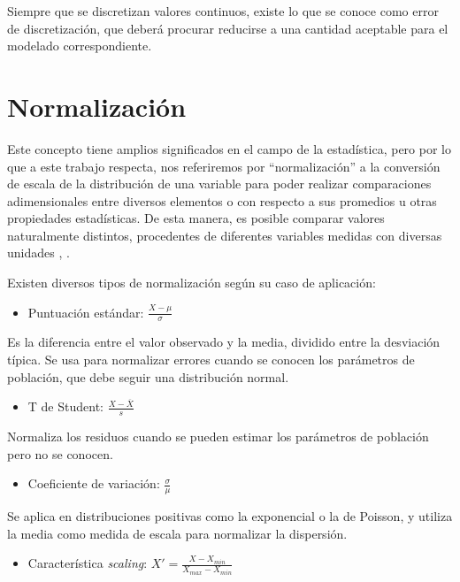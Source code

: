 Siempre que se discretizan valores continuos, existe lo que se conoce como error de discretización, que deberá procurar reducirse a una cantidad aceptable para el modelado correspondiente.

\section{Normalización}

Este concepto tiene amplios significados en el campo de la estadística, pero por lo que a este trabajo respecta, nos referiremos por ``normalización'' a la conversión de escala de la distribución de una variable para poder realizar comparaciones adimensionales entre diversos elementos o con respecto a sus promedios u otras propiedades estadísticas. De esta manera, es posible comparar valores naturalmente distintos, procedentes de diferentes variables medidas con diversas unidades \cite{normalizacion}, \cite{normalizacion2}.

Existen diversos tipos de normalización según su caso de aplicación:

\begin{itemize}
    \item Puntuación estándar: $\frac{X - \mu}{\sigma}$
\end{itemize}

Es  la diferencia entre el valor observado y la media, dividido entre la desviación típica. Se usa para normalizar errores cuando se conocen los parámetros de población, que debe seguir una distribución normal.

\begin{itemize}
    \item T de Student: $\frac{X - \overline{X}}{s}$
\end{itemize}

Normaliza los residuos cuando se pueden estimar los parámetros de población pero no se conocen.

\begin{itemize}
    \item Coeficiente de variación: $\frac{\sigma}{\mu}$
\end{itemize}

Se aplica en distribuciones positivas como la exponencial o la de Poisson, y utiliza la media como medida de escala para normalizar la dispersión.

\begin{itemize}
    \item Característica \textit{scaling}: $X' = \frac{X - X_{min}}{X_{max}-X_{min}}$
\end{itemize}

